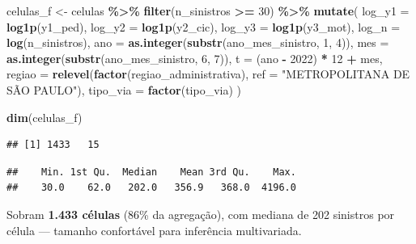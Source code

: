 \documentclass[
  11pt,
]{article}
\newenvironment{Shaded}{\begin{snugshade}}{\end{snugshade}}
\newcommand{\AttributeTok}[1]{\textcolor[rgb]{0.13,0.29,0.53}{#1}}
\newcommand{\DecValTok}[1]{\textcolor[rgb]{0.00,0.00,0.81}{#1}}
\newcommand{\FunctionTok}[1]{\textcolor[rgb]{0.13,0.29,0.53}{\textbf{#1}}}
\newcommand{\NormalTok}[1]{#1}
\newcommand{\OtherTok}[1]{\textcolor[rgb]{0.56,0.35,0.01}{#1}}
\newcommand{\SpecialCharTok}[1]{\textcolor[rgb]{0.81,0.36,0.00}{\textbf{#1}}}
\newcommand{\StringTok}[1]{\textcolor[rgb]{0.31,0.60,0.02}{#1}}
\begin{document}
\begin{Shaded}
\begin{Highlighting}[]
\NormalTok{celulas\_f }\OtherTok{\textless{}{-}}\NormalTok{ celulas }\SpecialCharTok{\%\textgreater{}\%}
  \FunctionTok{filter}\NormalTok{(n\_sinistros }\SpecialCharTok{\textgreater{}=} \DecValTok{30}\NormalTok{) }\SpecialCharTok{\%\textgreater{}\%}
  \FunctionTok{mutate}\NormalTok{(}
    \AttributeTok{log\_y1 =} \FunctionTok{log1p}\NormalTok{(y1\_ped),}
    \AttributeTok{log\_y2 =} \FunctionTok{log1p}\NormalTok{(y2\_cic),}
    \AttributeTok{log\_y3 =} \FunctionTok{log1p}\NormalTok{(y3\_mot),}
    \AttributeTok{log\_n  =} \FunctionTok{log}\NormalTok{(n\_sinistros),}
    \AttributeTok{ano    =} \FunctionTok{as.integer}\NormalTok{(}\FunctionTok{substr}\NormalTok{(ano\_mes\_sinistro, }\DecValTok{1}\NormalTok{, }\DecValTok{4}\NormalTok{)),}
    \AttributeTok{mes    =} \FunctionTok{as.integer}\NormalTok{(}\FunctionTok{substr}\NormalTok{(ano\_mes\_sinistro, }\DecValTok{6}\NormalTok{, }\DecValTok{7}\NormalTok{)),}
    \AttributeTok{t      =}\NormalTok{ (ano }\SpecialCharTok{{-}} \DecValTok{2022}\NormalTok{) }\SpecialCharTok{*} \DecValTok{12} \SpecialCharTok{+}\NormalTok{ mes,}
    \AttributeTok{regiao =} \FunctionTok{relevel}\NormalTok{(}\FunctionTok{factor}\NormalTok{(regiao\_administrativa),}
                     \AttributeTok{ref =} \StringTok{"METROPOLITANA DE SÃO PAULO"}\NormalTok{),}
    \AttributeTok{tipo\_via =} \FunctionTok{factor}\NormalTok{(tipo\_via)}
\NormalTok{  )}

\FunctionTok{dim}\NormalTok{(celulas\_f)}
\end{Highlighting}
\end{Shaded}

\begin{verbatim}
## [1] 1433   15
\end{verbatim}

\begin{Shaded}
\end{Shaded}

\begin{verbatim}
##    Min. 1st Qu.  Median    Mean 3rd Qu.    Max. 
##    30.0    62.0   202.0   356.9   368.0  4196.0
\end{verbatim}

Sobram \textbf{1.433 células} (86\% da agregação), com mediana de 202
sinistros por célula --- tamanho confortável para inferência
multivariada.
\end{document}
